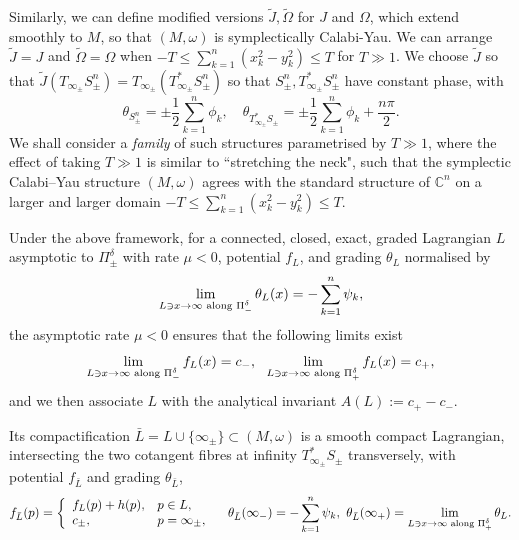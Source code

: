 \documentclass[11pt,a4paper]{article}
\numberwithin{equation}{section}%
\theoremstyle{definition}
\newcommand{\C}{\mathbb{C}}
\begin{document}
Similarly, we can define  modified versions $\widetilde{J}, \widetilde{\Omega}$ for $J$ and $\Omega$, which extend smoothly to $M$,  so that $(M,\omega)$ is symplectically Calabi-Yau. 
We can arrange $\widetilde{J}=J$ and $\widetilde{\Omega}=\Omega$ when $-T\leqslant \sum\limits_{k=1}^n (x_k^2-y_k^2)\leqslant T$ for $T\gg 1$. 
We choose $\widetilde{J}$ so that $\widetilde{J}(T_{\infty_\pm}S_\pm^n)=T_{\infty_\pm}(T^*_{\infty_\pm}S_\pm^n)$ so that $S_\pm^n, T^*_{\infty_\pm}S_\pm^n$ have constant phase, with 
\begin{equation}
    \label{eqn:compactgrading}
    \theta_{S_\pm^n}=\pm\frac{1}{2}\sum_{k=1}^n\phi_k,\quad  \theta_{ T^*_{\infty_\pm}S_\pm   }= \pm\frac{1}{2}\sum_{k=1}^n\phi_k+\frac{n\pi}{2}.
\end{equation}
We shall consider a \textit{family} of such structures parametrised by $T\gg 1$, where the effect of taking $T\gg 1$ is similar to ``stretching the neck", such that the symplectic Calabi--Yau structure $(M,\omega)$ agrees with the standard structure of $\C^{n}$ on a larger and larger domain $-T\leqslant \sum\limits_{k=1}^n (x_k^2-y_k^2)\leqslant T$. 

Under the above framework, for a connected, closed, exact, graded Lagrangian $L$ asymptotic to $\Pi_\pm^\delta$ with rate $\mu<0$, potential $f_L$, and grading $\theta_L$ normalised by
$$\lim_{L\ni x\to \infty \textnormal{~along }\Pi_-^\delta}\theta_L(x)=-\sum_{k=1}^n\psi_k,$$
the asymptotic rate $\mu<0$ ensures that the following limits exist
$$\lim_{L\ni x\to \infty \textnormal{~along }\Pi_-^\delta} f_L(x)=c_-, ~~\lim_{L\ni x\to \infty \textnormal{~along }\Pi_+^\delta} f_L(x)=c_+,$$
and we then associate $L$ with the analytical invariant $A(L):=c_+-c_-$. 

Its compactification $\bar L=L\cup\{\infty_\pm\}\subset (M,\omega)$ is a smooth compact Lagrangian, intersecting the two cotangent fibres at infinity $T_{\infty_\pm}^*S_\pm$ transversely, with potential $f_{\bar L}$ and grading $\theta_{\bar L}$,
\begin{equation}\label{eqn:potentialcompact}
        f_{\bar L}(p)=\left\{\begin{array}{ll}
           f_L(p)+h(p),  & p\in L, \\
            c_\pm, & p=\infty_\pm,\\
        \end{array}\right.\quad \theta_{\bar L}(\infty_-)=-\sum_{k=1}^n\psi_k,~\theta_{\bar L}(\infty_+)=\lim_{L\ni x\to \infty \textnormal{~along }\Pi_+^\delta}\theta_L.
\end{equation}
\end{document}
